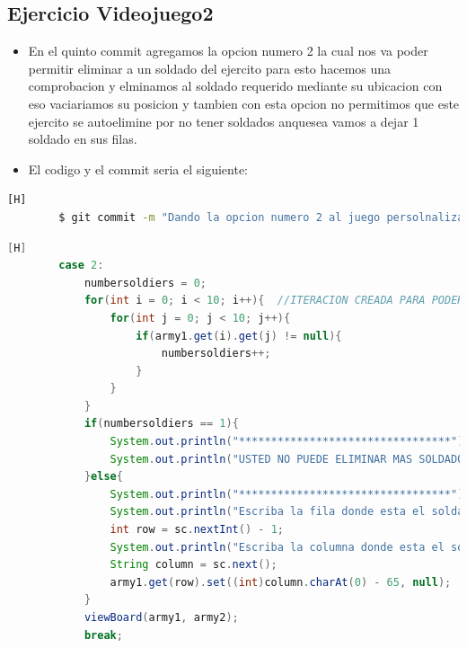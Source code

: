 \documentclass{article}
\begin{document}
	\subsection{Ejercicio Videojuego2}
	\begin{itemize}	
		\item En el quinto commit agregamos la opcion numero 2 la cual nos va poder permitir eliminar a un soldado del ejercito para esto hacemos una comprobacion y elminamos al soldado requerido mediante su ubicacion con eso vaciariamos su posicion y tambien con esta opcion no permitimos que este ejercito se autoelimine por no tener soldados anquesea vamos a dejar 1 soldado en sus filas.
		\item El codigo y el commit seria el siguiente:
	\end{itemize}	
	\begin{lstlisting}[language=bash,caption={Commit}][H]
		$ git commit -m "Dando la opcion numero 2 al juego persolnalizado la cual es eliminar a un soldado del ejercito pero sin que este ejercito se vacie para esto hacemos una condicion la cual nos va poder decir que esta anquesea va a tener 1 soldado en sus filas"
	\end{lstlisting}	
	\begin{lstlisting}[language=java,caption={Las lineas de codigos del metodo creado:}][H]
		case 2:
			numbersoldiers = 0;
			for(int i = 0; i < 10; i++){  //ITERACION CREADA PARA PODER SABER QUE SI ESTE BANDO DEL EJERCITO TIENE SOLDADOS PARA PODER JUGAR SI TIENE 10 ESTA OPCION ESTA CANCELADA
				for(int j = 0; j < 10; j++){
					if(army1.get(i).get(j) != null){
						numbersoldiers++;
					}
				}
			}
			if(numbersoldiers == 1){
				System.out.println("*********************************");
				System.out.println("USTED NO PUEDE ELIMINAR MAS SOLDADOS YA QUE ELIMINARIA A SU EJERCITO");    
			}else{
				System.out.println("*********************************");
				System.out.println("Escriba la fila donde esta el soldado el cual eliminara:");
				int row = sc.nextInt() - 1;
				System.out.println("Escriba la columna donde esta el soldado el cual eliminara:");
				String column = sc.next();
				army1.get(row).set((int)column.charAt(0) - 65, null);
			}
			viewBoard(army1, army2);
			break;
	\end{lstlisting}
\end{document}
